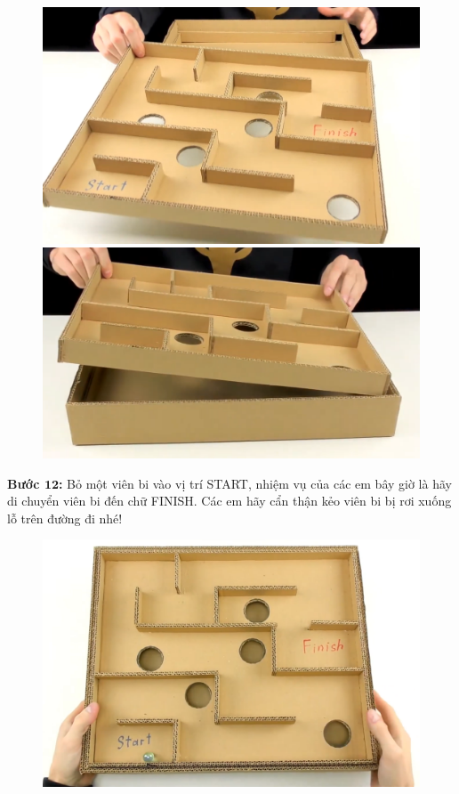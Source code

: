 \begin{multicols}{2}
\begin{figure}[H]
		\includegraphics[width= 0.9\linewidth]{19}
		\includegraphics[width= 0.9\linewidth]{20}
		\vspace*{-10pt}
	\end{figure}
	\textbf{\color{toancuabi}Bước $\pmb{12}$:} Bỏ một viên bi vào vị trí START, nhiệm vụ của các em bây giờ là hãy di chuyển viên bi đến chữ FINISH. Các em hãy cẩn thận kẻo viên bi bị rơi xuống lỗ trên đường đi nhé!
	\begin{figure}[H]
		\vspace*{-5pt}
		\centering
		\captionsetup{labelformat= empty, justification=centering}
		\includegraphics[width= 0.9\linewidth]{21}

\end{figure}
\end{multicols}
